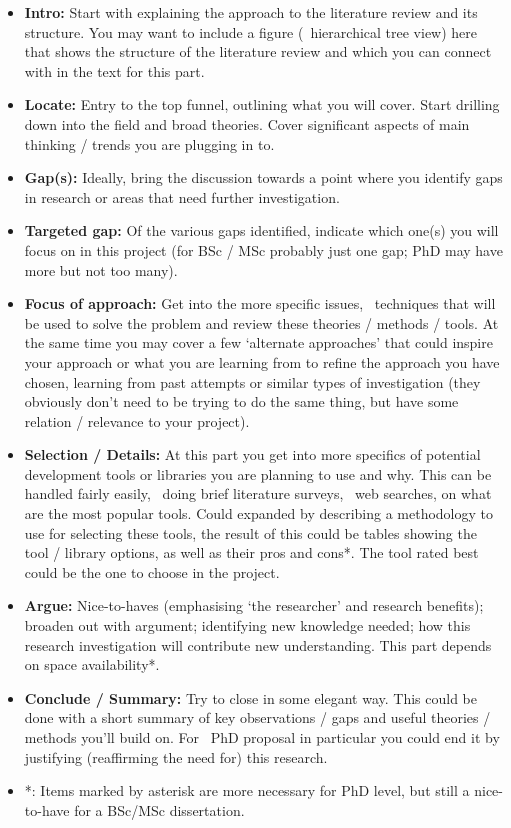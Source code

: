 \begin{itemize}
  \item \textbf{Intro:} Start with explaining the approach to the literature review and its structure. You may want to include a figure (\eg~hierarchical tree view) here that shows the structure of the literature review and which you can connect with in the text for this part.

  \item \textbf{Locate:} Entry to the top funnel, outlining what you will cover. Start drilling down into the field and broad theories. Cover significant aspects of main thinking / trends you are plugging in to.

  \item \textbf{Gap(s):} Ideally, bring the discussion towards a point where you identify gaps in research or areas that need further investigation.

  \item \textbf{Targeted gap:} Of the various gaps identified, indicate which one(s) you will focus on in this project (for BSc / MSc probably just one gap; PhD may have more but not too many).

  \item \textbf{Focus of approach:} Get into the more specific issues, \ie~techniques that will be used to solve the problem and review these theories / methods / tools.
  At the same time you may cover a few `alternate approaches' that could inspire your approach or what you are learning from to refine the approach you have chosen, learning from past attempts or similar types of investigation (they obviously don't need to be trying to do the same thing, but have some relation / relevance to your project).

  \item \textbf{Selection / Details:} At this part you get into more specifics of potential development tools or libraries you are planning to use and why.
  This can be handled fairly easily, \eg~doing brief literature surveys, \eg~web searches, on what are the most popular tools. Could expanded by describing a methodology to use for selecting these tools, the result of this could be tables showing the tool / library options, as well as their pros and cons*.  The tool rated best could be the one to choose in the project.

  \item \textbf{Argue:} Nice-to-haves (emphasising `the researcher' and research benefits); broaden out with argument; identifying new knowledge needed; how this research investigation will contribute new understanding. This part depends on space availability*.

  \item \textbf{Conclude / Summary:} Try to close in some elegant way.  This could be done with a short summary of key observations / gaps and useful theories / methods you'll build on. For \eg~PhD proposal in particular you could end it by justifying (reaffirming the need for) this research.

  \item *: Items marked by asterisk are more necessary for PhD level, but still a nice-to-have for a BSc/MSc dissertation.
\end{itemize}


